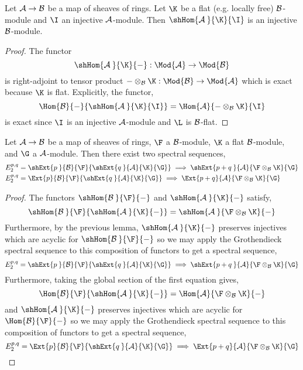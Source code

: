 \documentclass[12pt]{article}
\begin{document}
\begin{proposition} \label{flat_hom_injective}
Let $\mathcal{A} \to \mathcal{B}$ be a map of sheaves of rings. Let $\K$ be a flat (e.g. locally free) $\mathcal{B}$-module and $\I$ an injective $\mathcal{A}$-module. Then $\shHom{\sA \:}{\K}{\I}$ is an injective $\mathcal{B}$-module.
\end{proposition}

\begin{proof}
The functor
\[ \shHom{\sA \:}{\K}{-} : \Mod{\sA} \to \Mod{\sB} \] 
is right-adjoint to tensor product $- \otimes_{\sB} \K : \Mod{\sB} \to \Mod{\sA}$ which is exact because $\K$ is flat. Explicitly, the functor,
\[ \Hom{\sB}{-}{\shHom{\sA \:}{\K}{\I}} = \Hom{\sA}{- \otimes_{\sB} \K}{\I} \]
is exact since $\I$ is an injective $\mathcal{A}$-module and $\L$ is $\mathcal{B}$-flat.
\end{proof}

\begin{theorem}
Let $\mathcal{A} \to \mathcal{B}$ be a map of sheaves of rings, $\F$ a $\mathcal{B}$-module, $\K$ a flat $\mathcal{B}$-module, and $\G$ a $\mathcal{A}$-module. Then there exist two spectral sequences,
\begin{align*}
E^{p, q}_2 & = \shExt{p \:}{\sB}{\F}{\shExt{q \:}{\sA}{\K}{\G}} \implies \shExt{p+q \:}{\sA}{\F \otimes_{\sB} \K}{\G} 
\\
E^{p, q}_2 & = \Ext{p}{\sB}{\F}{\shExt{q \:}{\sA}{\K}{\G}} \implies \Ext{p+q}{\sA}{\F \otimes_{\sB} \K}{\G} 
\end{align*}
\end{theorem}

\begin{proof}
The functors $\shHom{\sB \:}{\F}{-}$ and $\shHom{\sA \:}{\K}{-}$ satisfy,
\[ \shHom{\sB \:}{\F}{\shHom{\sA \:}{\K}{-}} = \shHom{\sA \:}{\F \otimes_{\sB} \K}{-} \]
Furthermore, by the previous lemma, $\shHom{\sA \:}{\K}{-}$ preserves injectives which are acyclic for $\shHom{\sB \:}{\F}{-}$ so we may apply the Grothendieck spectral sequence to this composition of functors to get a spectral sequence,
\[ E^{p, q}_2 = \shExt{p \:}{\sB}{\F}{\shExt{q \:}{\sA}{\K}{\G}} \implies \shExt{p+q \:}{\sA}{\F \otimes_{\sB} \K}{\G} \]
Furthermore, taking the global section of the first equation gives,
\[ \Hom{\sB}{\F}{\shHom{\sA \:}{\K}{-}} = \Hom{\sA}{\F \otimes_{\sB} \K}{-} \]
and $\shHom{\sA \:}{\K}{-}$ preserves injectives which are acyclic for $\Hom{\sB}{\F}{-}$ so we may apply the Grothendieck spectral sequence to this composition of functors to get a spectral sequence,
\[ E^{p, q}_2 = \Ext{p}{\sB}{\F}{\shExt{q \:}{\sA}{\K}{\G}} \implies \Ext{p+q}{\sA}{\F \otimes_{\sB} \K}{\G} \]
\end{proof}
\end{document}

